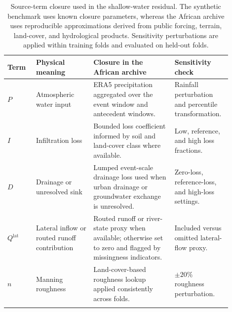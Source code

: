 \documentclass[pdflatex,sn-mathphys-ay]{sn-jnl}
\theoremstyle{thmstyleone}
\begin{document}
\begin{table}[p]
\centering
\small
\caption{Source-term closure used in the shallow-water residual.  The
synthetic benchmark uses known closure parameters, whereas the African
archive uses reproducible approximations derived from public forcing,
terrain, land-cover, and hydrological products.  Sensitivity
perturbations are applied within training folds and evaluated on held-out
folds.}
\label{tab:source_closure}
\begin{tabular}{p{0.12\linewidth}p{0.24\linewidth}p{0.34\linewidth}p{0.20\linewidth}}
\toprule
Term & Physical meaning & Closure in the African archive & Sensitivity check \\
\midrule
$P$ & Atmospheric water input & ERA5 precipitation aggregated over the event window and antecedent windows. & Rainfall perturbation and percentile transformation. \\
$I$ & Infiltration loss & Bounded loss coefficient informed by soil and land-cover class where available. & Low, reference, and high loss fractions. \\
$D$ & Drainage or unresolved sink & Lumped event-scale drainage loss used when urban drainage or groundwater exchange is unresolved. & Zero-loss, reference-loss, and high-loss settings. \\
$Q^{\mathrm{lat}}$ & Lateral inflow or routed runoff contribution & Routed runoff or river-state proxy when available; otherwise set to zero and flagged by missingness indicators. & Included versus omitted lateral-flow proxy. \\
$n$ & Manning roughness & Land-cover-based roughness lookup applied consistently across folds. & $\pm 20\%$ roughness perturbation. \\
\botrule
\end{tabular}
\end{table}
\end{document}
